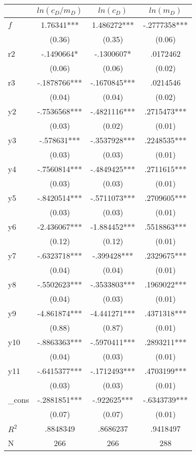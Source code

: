 \begin{tabular}{lccc}
            &   $ln(c_D/m_D)$   &   $ln(c_D)$   &     $ln(m_D)$   \\
\hline
$f$    &     1.76341***&    1.486272***&   -.2777358***\\
            &      (0.36)   &      (0.35)   &      (0.06)   \\
r2         &   -.1490664*  &   -.1300607*  &    .0172462   \\
            &      (0.06)   &      (0.06)   &      (0.02)   \\
r3         &   -.1878766***&   -.1670845***&    .0214546   \\
            &      (0.04)   &      (0.04)   &      (0.02)   \\
y2          &   -.7536568***&   -.4821116***&    .2715473***\\
            &      (0.03)   &      (0.02)   &      (0.01)   \\
y3          &    -.578631***&   -.3537928***&    .2248535***\\
            &      (0.03)   &      (0.03)   &      (0.01)   \\
y4          &   -.7560814***&   -.4849425***&    .2711615***\\
            &      (0.03)   &      (0.03)   &      (0.01)   \\
y5          &   -.8420514***&   -.5711073***&    .2709605***\\
            &      (0.03)   &      (0.03)   &      (0.01)   \\
y6          &   -2.436067***&   -1.884452***&    .5518863***\\
            &      (0.12)   &      (0.12)   &      (0.01)   \\
y7          &   -.6323718***&    -.399428***&    .2329675***\\
            &      (0.04)   &      (0.04)   &      (0.01)   \\
y8          &   -.5502623***&   -.3533803***&    .1969022***\\
            &      (0.04)   &      (0.03)   &      (0.01)   \\
y9          &   -4.861874***&   -4.441271***&    .4371318***\\
            &      (0.88)   &      (0.87)   &      (0.01)   \\
y10         &   -.8863363***&   -.5970411***&    .2893211***\\
            &      (0.04)   &      (0.03)   &      (0.01)   \\
y11         &   -.6415377***&   -.1712493***&    .4703199***\\
            &      (0.03)   &      (0.03)   &      (0.01)   \\
\_cons      &   -.2881851***&    -.922625***&   -.6343739***\\
            &      (0.07)   &      (0.07)   &      (0.01)   \\
$R^2$       &    .8848349   &    .8686237   &    .9418497   \\
N           &         266   &         266   &         288   \\
\end{tabular}
